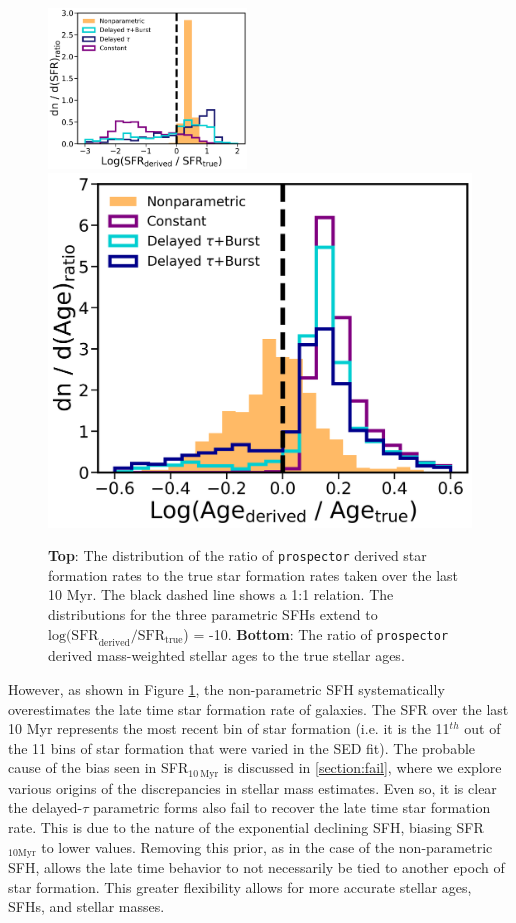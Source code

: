 \documentclass[twocolumn]{aastex62}
\begin{document}
\begin{figure}[h]

\centering
\includegraphics[width=0.47\textwidth]{SFRhist_all.png}\hfill
\includegraphics[width=.47\textwidth]{Agehist_taubdir.png}

\caption{\textbf{Top}: The distribution of the ratio of \texttt{prospector} derived star formation rates to the true star formation rates taken over the last 10 Myr. The black dashed line shows a 1:1 relation. The distributions for the three parametric SFHs extend to $\mathrm{log(SFR}_{\mathrm{derived}} / \mathrm{SFR}_{\mathrm{true}}$) = -10. \textbf{Bottom}: The ratio of \texttt{prospector} derived mass-weighted stellar ages to the true stellar ages.}
\label{fig:age_sfr}

\end{figure}

However, as shown in Figure \ref{fig:age_sfr}, the non-parametric SFH systematically overestimates the late time star formation rate of galaxies. The SFR over the last 10 Myr represents the most recent bin of star formation (i.e. it is the 11$^{th}$ out of the 11 bins of star formation that were varied in the SED fit). The probable cause of the bias seen in SFR$_{10 \: \mathrm{Myr}}$ is discussed in \ref{section:fail}, where we explore various origins of the discrepancies in stellar mass estimates. Even so, it is clear the delayed-$\tau$ parametric forms also fail to recover the late time star formation rate. This is due to the nature of the exponential declining SFH, biasing SFR$_{10 \mathrm{Myr}}$ to lower values. Removing this prior, as in the case of the non-parametric SFH, allows the late time behavior to not necessarily be tied to another epoch of star formation. This greater flexibility allows for more accurate stellar ages, SFHs, and stellar masses. 
\end{document}
